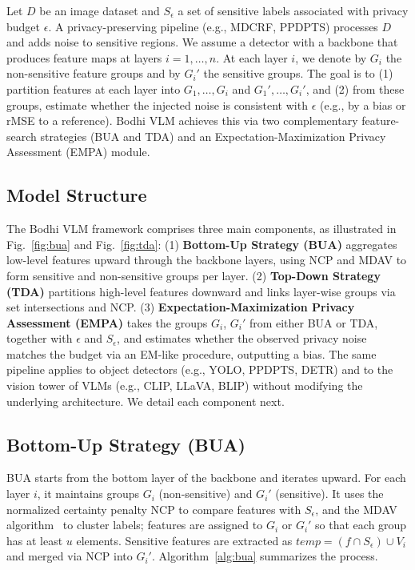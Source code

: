 \documentclass[journal,transmag]{IEEEtran}
\begin{document}
Let $D$ be an image dataset and $S_\epsilon$ a set of sensitive labels associated with privacy budget $\epsilon$. A privacy-preserving pipeline (e.g., MDCRF, PPDPTS) processes $D$ and adds noise to sensitive regions. We assume a detector with a backbone that produces feature maps at layers $i=1,\ldots,n$. At each layer $i$, we denote by $G_i$ the non-sensitive feature groups and by $G_i'$ the sensitive groups. The goal is to (1) partition features at each layer into $G_1,\ldots,G_i$ and $G_1',\ldots,G_i'$, and (2) from these groups, estimate whether the injected noise is consistent with $\epsilon$ (e.g., by a bias or rMSE to a reference). Bodhi VLM achieves this via two complementary feature-search strategies (BUA and TDA) and an Expectation-Maximization Privacy Assessment (EMPA) module.

\subsection{Model Structure}
\label{subsec:structure}

The Bodhi VLM framework comprises three main components, as illustrated in Fig.~\ref{fig:bua} and Fig.~\ref{fig:tda}: (1) \textbf{Bottom-Up Strategy (BUA)} aggregates low-level features upward through the backbone layers, using NCP and MDAV to form sensitive and non-sensitive groups per layer. (2) \textbf{Top-Down Strategy (TDA)} partitions high-level features downward and links layer-wise groups via set intersections and NCP. (3) \textbf{Expectation-Maximization Privacy Assessment (EMPA)} takes the groups $G_i$, $G_i'$ from either BUA or TDA, together with $\epsilon$ and $S_\epsilon$, and estimates whether the observed privacy noise matches the budget via an EM-like procedure, outputting a bias. The same pipeline applies to object detectors (e.g., YOLO, PPDPTS, DETR) and to the vision tower of VLMs (e.g., CLIP, LLaVA, BLIP) without modifying the underlying architecture. We detail each component next.

\subsection{Bottom-Up Strategy (BUA)}
\label{subsec:bua}

BUA starts from the bottom layer of the backbone and iterates upward. For each layer $i$, it maintains groups $G_i$ (non-sensitive) and $G_i'$ (sensitive). It uses the normalized certainty penalty NCP to compare features with $S_\epsilon$, and the MDAV algorithm~\cite{soria2014enhancing} to cluster labels; features are assigned to $G_i$ or $G_i'$ so that each group has at least $u$ elements. Sensitive features are extracted as $\mathit{temp} = (f \cap S_\epsilon) \cup V_i$ and merged via NCP into $G_i'$. Algorithm~\ref{alg:bua} summarizes the process.
\end{document}
